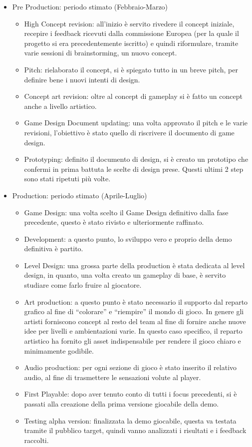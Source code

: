 \begin{itemize}

\item Pre Production: periodo stimato (Febbraio-Marzo)

\begin{itemize}
\item High Concept revision: all'inizio è servito rivedere il concept iniziale, recepire i feedback ricevuti dalla commissione Europea (per la quale il progetto si era precedentemente iscritto) e quindi riformulare, tramite varie sessioni di brainstorming, un nuovo concept.
\item Pitch: rielaborato il concept, si è spiegato tutto in un breve pitch, per definire bene i nuovi intenti di design.
\item Concept art revision: oltre al concept di gameplay si è fatto un concept anche a livello artistico.
\item Game Design Document updating: una volta approvato il pitch e le varie revisioni, l'obiettivo è stato quello di riscrivere il documento di game design.
\item Prototyping: definito il documento di design, si è creato un prototipo che confermi in prima battuta le scelte di design prese. Questi ultimi 2 step sono stati ripetuti più volte.
\end{itemize}

\item Production: periodo stimato (Aprile-Luglio)

\begin{itemize}
\item Game Design: una volta scelto il Game Design definitivo dalla fase precedente, questo è stato rivisto e ulteriormente raffinato.
\item Development: a questo punto, lo sviluppo vero e proprio della demo definitiva è partito.
\item Level Design: una grossa parte della production è stata dedicata al level design, in quanto, una volta creato un gameplay di base, è servito studiare come farlo fruire al giocatore.
\item Art production: a questo punto è stato necessario il supporto dal reparto grafico al fine di ``colorare'' e ``riempire'' il mondo di gioco. In genere gli artisti forniscono concept al resto del team al fine di fornire anche nuove idee per livelli e ambientazioni varie. In questo caso specifico, il reparto artistico ha fornito gli asset indispensabile per rendere il gioco chiaro e minimamente godibile.
\item Audio production: per ogni sezione di gioco è stato inserito il relativo audio, al fine di trasmettere le sensazioni volute al player.
\item First Playable: dopo aver tenuto conto di tutti i focus precedenti, si è passati alla creazione della prima versione giocabile della demo.
\item Testing alpha version: finalizzata la demo giocabile, questa va testata tramite il pubblico target, quindi vanno analizzati i risultati e i feedback raccolti.
\end{itemize}

\end{itemize}

